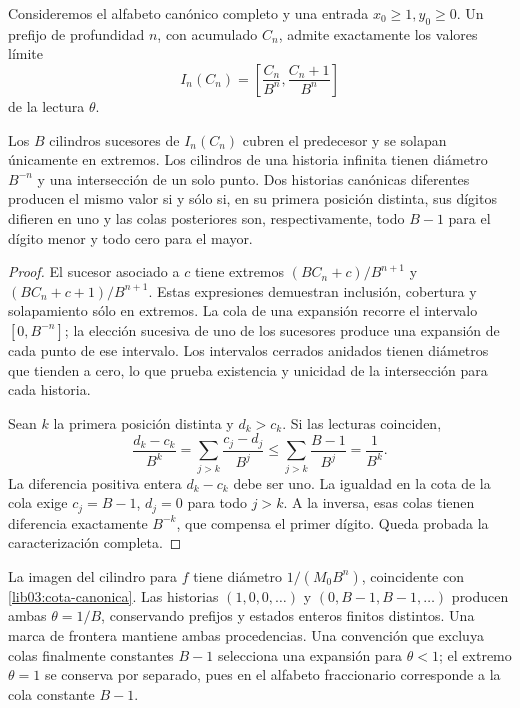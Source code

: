 Consideremos el alfabeto canónico completo y una entrada
\(x_0\geq1,y_0\geq0\). Un prefijo de profundidad \(n\), con
acumulado \(C_n\), admite exactamente los valores límite
\begin{equation}
 I_n(C_n)=\left[\frac{C_n}{B^n},\frac{C_n+1}{B^n}\right]
 \label{lib03:cilindro}
\end{equation}
de la lectura \(\theta\).

\begin{theorem}
\label{lib03:teo-cilindros}
Los \(B\) cilindros sucesores de \(I_n(C_n)\) cubren el predecesor y se
solapan únicamente en extremos. Los cilindros de una historia infinita
tienen diámetro \(B^{-n}\) y una intersección de un solo punto.
Dos historias canónicas diferentes producen el mismo valor si y sólo
si, en su primera posición distinta, sus dígitos difieren en uno y las
colas posteriores son, respectivamente, todo \(B-1\) para el dígito
menor y todo cero para el mayor.
\end{theorem}

\begin{proof}
El sucesor asociado a \(c\) tiene extremos
\((BC_n+c)/B^{n+1}\) y \((BC_n+c+1)/B^{n+1}\).
Estas expresiones demuestran inclusión, cobertura y solapamiento sólo
en extremos. La cola de una expansión recorre el intervalo
\([0,B^{-n}]\); la elección sucesiva de uno de los sucesores produce una
expansión de cada punto de ese intervalo. Los intervalos cerrados
anidados tienen diámetros que tienden a cero, lo que prueba existencia
y unicidad de la intersección para cada historia.

Sean \(k\) la primera posición distinta y \(d_k>c_k\). Si las
lecturas coinciden,
\[
 \frac{d_k-c_k}{B^k}
 =\sum_{j>k}\frac{c_j-d_j}{B^j}
 \leq\sum_{j>k}\frac{B-1}{B^j}=\frac1{B^k}.
\]
La diferencia positiva entera \(d_k-c_k\) debe ser uno. La igualdad
en la cota de la cola exige \(c_j=B-1\), \(d_j=0\) para todo
\(j>k\). A la inversa, esas colas tienen diferencia exactamente
\(B^{-k}\), que compensa el primer dígito. Queda probada la
caracterización completa.
\end{proof}

La imagen del cilindro para \(f\) tiene diámetro
\(1/(M_0B^n)\), coincidente con \eqref{lib03:cota-canonica}.
Las historias \((1,0,0,\ldots)\) y
\((0,B-1,B-1,\ldots)\) producen ambas \(\theta=1/B\), conservando
prefijos y estados enteros finitos distintos. Una marca de frontera
mantiene ambas procedencias. Una convención que excluya colas finalmente
constantes \(B-1\) selecciona una expansión para \(\theta<1\);
el extremo \(\theta=1\) se conserva por separado, pues en el
alfabeto fraccionario corresponde a la cola constante \(B-1\).

